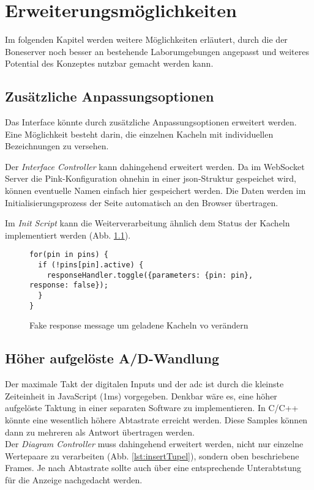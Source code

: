 \chapter{Erweiterungsmöglichkeiten}
Im folgenden Kapitel werden weitere Möglichkeiten erläutert, durch die der Boneserver noch besser an bestehende Laborumgebungen angepasst und weiteres Potential des Konzeptes nutzbar gemacht werden kann.

\section{Zusätzliche Anpassungsoptionen}
Das Interface könnte durch zusätzliche Anpassungsoptionen erweitert werden. Eine Mög\-lich\-keit besteht darin, die einzelnen Kacheln mit individuellen Bezeichnungen zu versehen.

Der \textit{Interface Controller} kann dahingehend erweitert werden. Da im WebSocket Server die Pink-Konfiguration ohnehin in einer \gls{json}-Struktur gespeichet wird, können eventuelle Namen einfach hier gespeichert werden. Die Daten werden im Initialisierungsprozess der Seite automatisch an den Browser übertragen.

Im \textit{Init Script} kann die Weiterverarbeitung ähnlich dem Status der Kacheln implementiert werden (Abb. \ref{lst:fakeResponseMessage}).

\begin{figure}[H]
\begin{lstlisting}
for(pin in pins) {
  if (!pins[pin].active) {
    responseHandler.toggle({parameters: {pin: pin}, response: false});
  }
}
\end{lstlisting}
\caption{Fake response message um geladene Kacheln vo verändern}
\label{lst:fakeResponseMessage}
\end{figure}


\section{Höher aufgelöste A/D-Wandlung}
Der maximale Takt der digitalen Inputs und der \gls{adc} ist durch die kleinste Zeiteinheit in JavaScript (1ms) vorgegeben. Denkbar wäre es, eine höher aufgelöste Taktung in einer separaten Software zu implementieren. In C/C++ könnte eine wesentlich höhere Ab\-tast\-rate erreicht werden. Diese Samples können dann zu mehreren als Antwort übertragen werden.\\

Der \textit{Diagram Controller} muss dahingehend erweitert werden, nicht nur einzelne Wertepaare zu verarbeiten (Abb. \ref{lst:insertTupel}), sondern oben beschriebene Frames. Je nach Abtastrate sollte auch über eine entsprechende Unterabtstung für die Anzeige nachgedacht werden.

